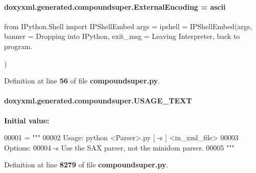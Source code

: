 \paragraph[{External\+Encoding}]{ doxyxml.\+generated.\+compoundsuper.\+External\+Encoding = \textquotesingle{}ascii\textquotesingle{}}\label{namespacedoxyxml_1_1generated_1_1compoundsuper_a7bdd695a37ccf39dff89ed666197484a}


from I\+Python.\+Shell import I\+P\+Shell\+Embed args = \textquotesingle{}\textquotesingle{} ipshell = I\+P\+Shell\+Embed(args, banner = \textquotesingle{}Dropping into I\+Python\textquotesingle{}, exit\+\_\+msg = \textquotesingle{}Leaving Interpreter, back to program. 

\textquotesingle{}) 

Definition at line {\bf 56} of file {\bf compoundsuper.\+py}.

\paragraph[{U\+S\+A\+G\+E\+\_\+\+T\+E\+XT}]{ doxyxml.\+generated.\+compoundsuper.\+U\+S\+A\+G\+E\+\_\+\+T\+E\+XT}\label{namespacedoxyxml_1_1generated_1_1compoundsuper_aabd4f5736d50871e9797ecb199892233}
{\bfseries Initial value\+:}
\begin{DoxyCode}
00001 = \textcolor{stringliteral}{"""}
00002 \textcolor{stringliteral}{Usage: python <Parser>.py [ -s ] <in\_xml\_file>}
00003 \textcolor{stringliteral}{Options:}
00004 \textcolor{stringliteral}{    -s        Use the SAX parser, not the minidom parser.}
00005 \textcolor{stringliteral}{"""}
\end{DoxyCode}


Definition at line {\bf 8279} of file {\bf compoundsuper.\+py}.

